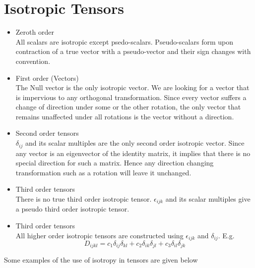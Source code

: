 \documentclass[11pt, letterpaper]{article}
\newcommand{\e}{\epsilon}
\newcommand{\dl}{\delta}
\newcommand{\1}{\bm{1}}
\begin{document}
\section{Isotropic Tensors}
\begin{itemize}
  \item Zeroth order\\
  All scalars are isotropic except psedo-scalars. Pseudo-scalars form upon contraction of a true vector with a pseudo-vector and their sign changes with convention.

  \item First order (Vectors)\\
  The Null vector is the only isotropic vector. We are looking for a vector that is impervious to any orthogonal transformation. Since every vector suffers a change of direction under some or the other rotation, the only vector that remains unaffected under all rotations is the vector without a direction.

  \item Second order tensors\\
  $\dl_{ij}$ and its scalar multiples are the only second order isotropic vector. Since any vector is an eigenvector of the identity matrix, it implies that there is no special direction for such a matrix. Hence any direction changing transformation such as a rotation will leave it unchanged. 

  \item Third order tensors\\
  There is no true third order isotropic tensor. $\e_{ijk}$ and its scalar multiples give a pseudo third order isotropic tensor.

  \item Third order tensors\\
  All higher order isotropic tensors are constructed using $\e_{ijk}$ and $\dl_{ij}$. E.g.
$$D_{ijkl} = c_1\dl_{ij}\dl_{kl} + c_2\dl_{ik}\dl_{jl} + c_3\dl_{il}\dl_{jk} $$
\end{itemize}

Some examples of the use of isotropy in tensors are given below
\end{document}
